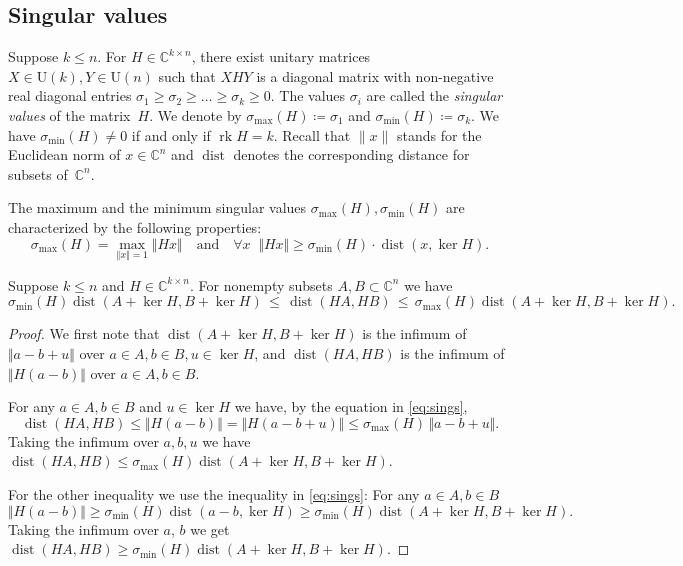 \documentclass[a4paper,USenglish,cleveref,numberwithinsect]{lipics-v2021}
\DeclareMathOperator{\rk}{rk}
\DeclareMathOperator{\dist}{dist}
\newcommand{\CC}{\mathbb{C}}
\numberwithin{equation}{section}
\begin{document}
\subsection{Singular values}
Suppose $k\leq n$. For $H\in\CC^{k\times n}$, there exist unitary matrices
$X\in\mathrm{U}(k), Y\in \mathrm{U}(n)$
such that $XHY$ is a diagonal matrix with non-negative real diagonal entries
$\sigma_1\geq\sigma_2\geq\dots\geq\sigma_k\geq 0$.
The values $\sigma_i$ are called the \textit{singular values} of the matrix~$H$.
We denote by $\sigma_{\max}(H)\coloneqq\sigma_1$ and $\sigma_{\min}(H)\coloneqq\sigma_k$.
We have $\sigma_{\min}(H)\neq 0$ if and only if $\rk H=k$.
Recall that $\|x\|$ stands for the Euclidean norm of $x\in\CC^n$
and $\dist$ denotes the corresponding distance for subsets of~$\CC^n$.

The maximum and the minimum singular values $\sigma_{\max}(H), \sigma_{\min}(H)$
are characterized by the following properties:
\begin{equation}\label{eq:sings}
	\sigma_{\max}(H) = \max_{\Vert x\Vert =1} \Vert Hx\Vert
	\quad\text{and}\quad
       \forall x \;\; \Vert Hx\Vert\geq\sigma_{\min}(H)\cdot \dist(x, \ker H).
\end{equation}

\begin{lemma}
\label{lem:sing-value-inequality}
Suppose $k\leq n$ and $H\in\CC^{k\times n}$.
For nonempty subsets $A,B\subset\CC^n$ we have
\[
 \sigma_{\min}(H)\dist(A+\ker H,B+\ker H)\,\leq\,\dist(HA, HB)\,\leq\,\sigma_{\max}(H) \dist(A+\ker H,B+\ker H).
\]
\end{lemma}

\begin{proof}
We first note that $\dist(A+\ker H, B+\ker H)$ is the infimum of $\Vert a-b+u\Vert$ over $a\in A, b\in B, u \in \ker H$,
and
$\dist(HA,HB)$ is the infimum of $\Vert H(a-b)\Vert$ over $a\in A, b\in B$.

For any $a\in A, b\in B$ and $u\in \ker H$ we have, by the equation in \eqref{eq:sings},
\[
 \dist(HA, HB) \leq \Vert H(a-b)\Vert = \Vert H(a-b+u)\Vert \leq \sigma_{\max}(H)\, \Vert a-b+u\Vert.
\]
Taking the infimum over $a,b,u$ we have $\dist(HA,HB)\leq \sigma_{\max}(H)\dist(A+\ker H, B+\ker H)$.

For the other inequality we use the inequality in \eqref{eq:sings}: For any $a\in A, b\in B$
\[
 \Vert H(a-b)\Vert \geq \sigma_{\min}(H) \dist( a-b, \ker H ) \geq \sigma_{\min}(H) \dist(A+\ker H, B+\ker H).
\]
Taking the infimum over $a$, $b$ we get $\dist(HA,HB)\geq \sigma_{\min}(H)\dist(A+\ker H, B+\ker H)$.
\end{proof}
\end{document}
